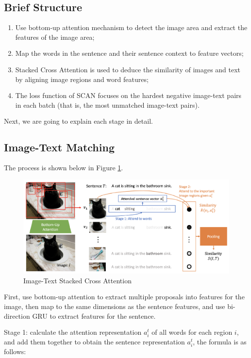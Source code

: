 \subsection{Brief Structure}
\begin{enumerate}
    \item Use bottom-up attention mechanism \cite{bottomup} to detect the image area and extract the features of the image area;
    \item Map the words in the sentence and their sentence context to feature vectors;
    \item Stacked Cross Attention is used to deduce the similarity of images and text by aligning image regions and word features;
    \item The loss function of SCAN focuses on the hardest negative image-text pairs in each batch (that is, the most unmatched image-text pairs).
\end{enumerate}

Next, we are going to explain each stage in detail.

\subsection{Image-Text Matching}

The process is shown below in Figure \ref{fig:scan1}.

\begin{figure}[h!]
\centering
\includegraphics[width=1\textwidth]{scan1.pdf}
\caption{Image-Text Stacked Cross Attention \cite{scan}}
\label{fig:scan1}
\end{figure}

First, use bottom-up attention \cite{bottomup} to extract multiple proposals into features for the image, then map to the same dimensions as the sentence features, and use bi-direction GRU to extract features for the sentence.

Stage 1: calculate the attention representation $a_{i}^{t}$ of all words for each region $i$, and add them together to obtain the sentence representation $a_{i}^{t}$, the formula is as follows:

